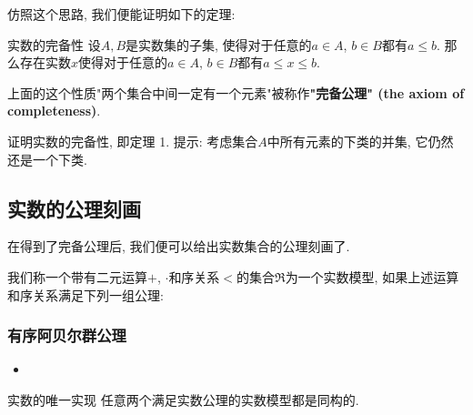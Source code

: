 仿照这个思路, 我们便能证明如下的定理:

\begin{theorem}{实数的完备性}
设$A,B$是实数集的子集, 使得对于任意的$a\in A$, $b\in B$都有$a\leq b$. 那么存在实数$x$使得对于任意的$a\in A$, $b\in B$都有$a\leq x\leq b$.
\end{theorem}

上面的这个性质"两个集合中间一定有一个元素"被称作\textbf{"完备公理" (the axiom of completeness)}.

\begin{exercise}{}
证明实数的完备性, 即定理 1. 提示: 考虑集合$A$中所有元素的下类的并集, 它仍然还是一个下类.
\end{exercise}

\subsection{实数的公理刻画}

在得到了完备公理后, 我们便可以给出实数集合的公理刻画了. 

我们称一个带有二元运算$+$, $\cdot$和序关系$<$的集合$\mathfrak{R}$为一个实数模型, 如果上述运算和序关系满足下列一组公理:

\subsubsection{有序阿贝尔群公理}
\begin{itemize}
\item 
\end{itemize}

\begin{theorem}{实数的唯一实现}
任意两个满足实数公理的实数模型都是同构的.
\end{theorem}